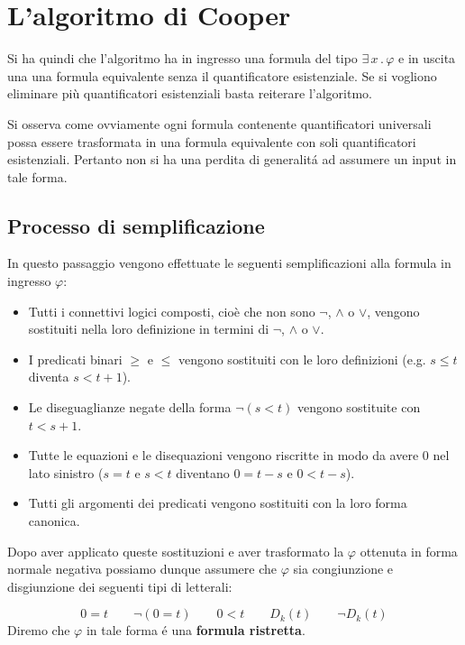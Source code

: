 \documentclass[11pt,letterpaper,twoside]{article}
\begin{document}
\section{L'algoritmo di Cooper}
Si ha quindi che l'algoritmo ha in ingresso una formula del tipo $\exists
\,x \,.\, \varphi$ e in uscita una una formula equivalente senza il
quantificatore esistenziale. Se si vogliono eliminare pi\`u quantificatori
esistenziali basta reiterare l'algoritmo.

Si osserva come ovviamente ogni formula contenente quantificatori universali
possa essere trasformata in una formula equivalente con soli quantificatori
esistenziali.
Pertanto non si ha una perdita di generalit\'a ad assumere un input in tale
forma.

\subsection{Processo di semplificazione}
In questo passaggio vengono effettuate le seguenti semplificazioni alla formula
in ingresso $\varphi$:
\begin{itemize}
\item Tutti i connettivi logici composti, cio\`e che non sono $\lnot$, $\land$ o
  $\lor$, vengono sostituiti nella loro definizione in termini di $\lnot$,
  $\land$ o $\lor$.
\item I predicati binari $\ge$ e $\le$ vengono sostituiti con le loro
  definizioni (e.g. $s \le t$ diventa $s < t + 1$). 
\item Le diseguaglianze negate della forma $\lnot (s < t)$ vengono sostituite
  con $t < s + 1$.
\item Tutte le equazioni e le disequazioni vengono riscritte in modo da avere
  $0$ nel lato sinistro ($s=t$ e $s<t$ diventano $0=t-s$ e $0<t-s$).
\item Tutti gli argomenti dei predicati vengono sostituiti con la loro forma
  canonica.
\end{itemize}
Dopo aver applicato queste sostituzioni e aver trasformato la $\varphi$ ottenuta
in forma normale negativa possiamo dunque assumere che $\varphi$ sia
congiunzione e disgiunzione dei seguenti tipi di letterali:

$$0=t \qquad \lnot(0=t) \qquad 0<t \qquad D_k(t) \qquad \lnot D_k(t)$$
Diremo che $\varphi$ in tale forma \'e una \textbf{formula ristretta}.
\end{document}
